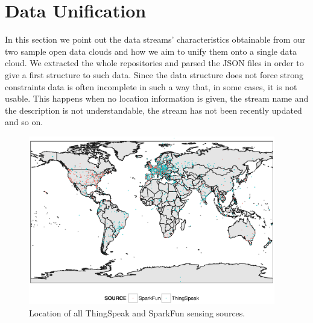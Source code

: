 \section{Data Unification}
\label{sec:unification}
In this section we point out the data streams' characteristics obtainable from our two sample open data clouds and how we aim to unify them onto a single data cloud.
We extracted the whole repositories and parsed the JSON files in order to give a first structure to such data.
Since the data structure does not force strong constraints data is often incomplete in such a way that, in some cases, it is not usable.
This happens when no location information is given, the stream name and the description is not understandable, the stream has not been recently updated and so on.
\\

\begin{figure}[t]
\centering
\includegraphics[width=0.96\textwidth]{img/map.eps} 
\caption{Location of all ThingSpeak and SparkFun sensing sources.}
\label{geo}
\end{figure}

